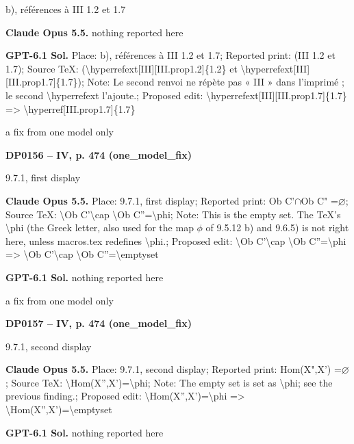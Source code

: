 b), références à III 1.2 et 1.7\par
\textbf{Claude Opus 5.5.} nothing reported here\par
\textbf{GPT-6.1 Sol.} Place: b), références à III 1.2 et 1.7; Reported print: (III 1.2 et 1.7); Source TeX: (\textbackslash{}hyperrefext[III][III.prop1.2]\{1.2\} et \textbackslash{}hyperrefext[III][III.prop1.7]\{1.7\}); Note: Le second renvoi ne répète pas « III » dans l'imprimé ; le second \textbackslash{}hyperrefext l'ajoute.; Proposed edit: \textbackslash{}hyperrefext[III][III.prop1.7]\{1.7\} =\allowbreak > \textbackslash{}hyperref[III.prop1.7]\{1.7\}\par
a fix from one model only\par
\par\noindent\hypertarget{DP0156}{}\textbf{DP0156 -- IV, p. 474 (one\_model\_fix)}\par
9.7.1, first display\par
\textbf{Claude Opus 5.5.} Place: 9.7.1, first display; Reported print: Ob C'\ensuremath{\cap}Ob C" =\allowbreak  \ensuremath{\varnothing}; Source TeX: \textbackslash{}Ob C'\textbackslash{}cap \textbackslash{}Ob C''=\allowbreak \textbackslash{}phi; Note: This is the empty set. The TeX's \textbackslash{}phi (the Greek letter, also used for the map \ensuremath{\phi} of 9.5.12 b) and 9.6.5) is not right here, unless macros.tex redefines \textbackslash{}phi.; Proposed edit: \textbackslash{}Ob C'\textbackslash{}cap \textbackslash{}Ob C''=\allowbreak \textbackslash{}phi =\allowbreak > \textbackslash{}Ob C'\textbackslash{}cap \textbackslash{}Ob C''=\allowbreak \textbackslash{}emptyset\par
\textbf{GPT-6.1 Sol.} nothing reported here\par
a fix from one model only\par
\par\noindent\hypertarget{DP0157}{}\textbf{DP0157 -- IV, p. 474 (one\_model\_fix)}\par
9.7.1, second display\par
\textbf{Claude Opus 5.5.} Place: 9.7.1, second display; Reported print: Hom(X",X') =\allowbreak  \ensuremath{\varnothing}; Source TeX: \textbackslash{}Hom(X'',X')=\allowbreak \textbackslash{}phi; Note: The empty set is set as \textbackslash{}phi; see the previous finding.; Proposed edit: \textbackslash{}Hom(X'',X')=\allowbreak \textbackslash{}phi =\allowbreak > \textbackslash{}Hom(X'',X')=\allowbreak \textbackslash{}emptyset\par
\textbf{GPT-6.1 Sol.} nothing reported here\par
